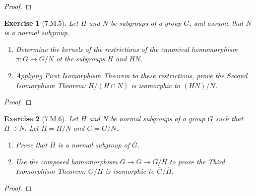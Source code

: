 \documentclass[12pt]{article}
\newtheorem*{exer}{Exercise}
\begin{document}
\begin{proof}

\end{proof}


\begin{exer}[7.M.5]

    Let $H$ and $N$ be subgroups of a group $G$, and assume that $N$ is
    a normal subgroup.

    \begin{enumerate}
        \item Determine the kernels of the restrictions of the canonical
            homomorphism $\pi : G \rightarrow G/N$ ot the subgroups $H$
            and $HN$. 

        \item Applying First Isomorphism Theorem to these restrictions,
            prove the \textit{Second Isomorphism Theorem}: $H/(H \cap
            N)$ is isomorphic to $(HN)/N$. 
    \end{enumerate}

\end{exer}

\begin{proof}

\end{proof}


\begin{exer}[7.M.6]

    Let $H$ and $N$ be normal subgroups of a group $G$ such that $H
    \supset N$. Let $\overline{H} = H/N$ and $\overline{G} = G/N$.

    \begin{enumerate}
        \item Prove that $\overline{H}$ is a normal subgroup of
            $\overline{G}$. 
        \item Use the composed homomorphism $G \rightarrow \overline{G}
            \rightarrow \overline{G}/\overline{H}$ to prove the
            \textit{Third Isomorphism Theorem}: $G/H$ is isomorphic to
            $\overline{G} / \overline{H}$.
            
    \end{enumerate}

\end{exer}

\begin{proof}

\end{proof}
\end{document}
